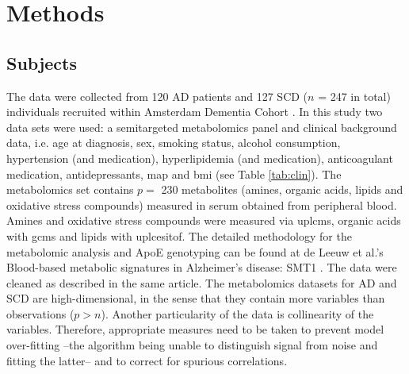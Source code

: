 \documentclass{amsart}
\begin{document}
\newpage
\section{Methods}\label{methods}

\subsection{Subjects}\label{subjects}
The data were collected from 120 AD patients and 127 SCD ($n$ = 247 in total) individuals recruited within Amsterdam Dementia Cohort \cite{VanDerFlier2018AmsterdamCare, deLeeuw2017Blood-basedDisease}. In this study two data sets were used: a semitargeted metabolomics panel and clinical background data, i.e. age at diagnosis, sex, smoking status, alcohol consumption, hypertension (and medication), hyperlipidemia (and medication), anticoagulant medication, antidepressants, \acrfull{map} and \acrfull{bmi} (see Table \ref{tab:clin}). The metabolomics set contains $p =$ 230 metabolites (amines, organic acids, lipids and oxidative stress compounds) measured in serum obtained from peripheral blood. Amines and oxidative stress compounds were measured via \acrfull{uplcms}, organic acids with \acrfull{gcms} and lipids with \acrfull{uplcesitof}. The detailed methodology for the metabolomic analysis and ApoE genotyping can be found at de Leeuw et al.'s  Blood-based metabolic signatures in Alzheimer's disease: SMT1 \cite{deLeeuw2017Blood-basedDisease}. The data were cleaned as described in the same article. The metabolomics datasets for AD and SCD are high-dimensional, in the sense that they contain more variables than observations ($p > n$). Another particularity of the data is collinearity of the variables. Therefore, appropriate measures need to be taken to prevent model over-fitting --the algorithm being unable to distinguish signal from noise and fitting the latter--  and to correct for spurious correlations.
\end{document}
